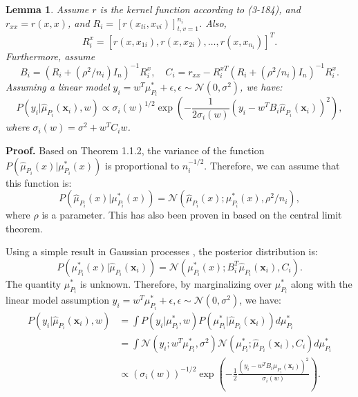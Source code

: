 \documentclass[12pt]{article}
\newtheorem{lemma}{Lemma}[section]
\begin{document}
	\begin{lemma}
		Assume $r$ is the kernel function according to (3-184), and $r_{xx} = r(x, x)$, and $R_i = [r(x_{ti}, x_{vi})]_{t,v=1}^{n_i}$. Also,
		\begin{equation}
			R_i^x = [r(x, x_{1i}), r(x, x_{2i}), \ldots, r(x, x_{n_i})]^T.
		\end{equation}
		Furthermore, assume
		\begin{equation}
			B_i = (R_i + (\rho^2 / n_i) I_n)^{-1} R_i^x, \quad C_i = r_{xx} - R_i^{xT} (R_i + (\rho^2 / n_i) I_n)^{-1} R_i^x.
		\end{equation}
		Assuming a linear model $y_i = w^T \mu^*_{P_i} + \epsilon, \epsilon \sim \mathcal{N}(0, \sigma^2)$, we have:
		\begin{equation}
			P(y_i | \hat{\mu}_{P_i}(\mathbf{x}_i), w) \propto \sigma_i(w)^{1/2} \exp\left( -\frac{1}{2 \sigma_i(w)} (y_i - w^T B_i \hat{\mu}_{P_i}(\mathbf{x}_i))^2 \right),
		\end{equation}
		where $\sigma_i(w) = \sigma^2 + w^T C_i w$.
	\end{lemma}
	
	\textbf{Proof.} Based on Theorem 1.1.2, the variance of the function $P(\hat{\mu}_{P_i}(x) | \mu^*_{P_i}(x))$ is proportional to $n_i^{-1/2}$. Therefore, we can assume that this function is:
	\begin{equation}
		P(\hat{\mu}_{P_i}(x) | \mu^*_{P_i}(x)) = \mathcal{N}(\hat{\mu}_{P_i}(x); \mu^*_{P_i}(x), \rho^2 / n_i),
	\end{equation}
	where $\rho$ is a parameter. This has also been proven in \cite{flaxman2015fast} based on the central limit theorem.
	
	Using a simple result in Gaussian processes \cite{mackay1992information}, the posterior distribution is:
	\begin{equation}
		P(\mu^*_{P_i}(x) | \hat{\mu}_{P_i}(\mathbf{x}_i)) = \mathcal{N}(\mu^*_{P_i}(x); B_i^T \hat{\mu}_{P_i}(\mathbf{x}_i), C_i).
	\end{equation}
	The quantity $\mu^*_{P_i}$ is unknown. Therefore, by marginalizing over $\mu^*_{P_i}$ along with the linear model assumption $y_i = w^T \mu^*_{P_i} + \epsilon, \epsilon \sim \mathcal{N}(0, \sigma^2)$, we have:
	\begin{align}
		P(y_i | \hat{\mu}_{P_i}(\mathbf{x}_i), w) &= \int P(y_i | \mu^*_{P_i}, w) P(\mu^*_{P_i} | \hat{\mu}_{P_i}(\mathbf{x}_i)) d\mu^*_{P_i} \\
		&= \int \mathcal{N}(y_i; w^T \mu^*_{P_i}, \sigma^2) \mathcal{N}(\mu^*_{P_i}; \hat{\mu}_{P_i}(\mathbf{x}_i), C_i) d\mu^*_{P_i} \\
		&\propto (\sigma_i(w))^{-1/2} \exp\left( -\frac{1}{2} \frac{(y_i - w^T B_i \hat{\mu}_{P_i}(\mathbf{x}_i))^2}{\sigma_i(w)} \right).
	\end{align}
	
\end{document}
